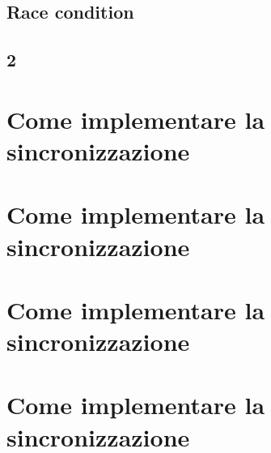 \subsection{Race condition}
\subsection{2}

\section{Come implementare la sincronizzazione}

\section{Come implementare la sincronizzazione}

\section{Come implementare la sincronizzazione}

\section{Come implementare la sincronizzazione}

